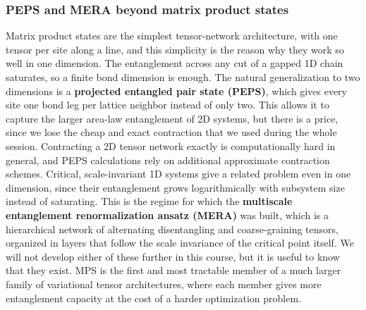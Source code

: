 \documentclass[lecture_notes.tex]{subfiles}
\begin{document}
\subsubsection{PEPS and MERA beyond matrix product states}
Matrix product states are the simplest tensor-network architecture, with one tensor per site along
a line, and this simplicity is the reason why they work so well in one dimension. The entanglement
across any cut of a gapped 1D chain saturates, so a finite bond dimension is enough. The natural
generalization to two dimensions is a \textbf{projected entangled pair state (PEPS)}, which gives
every site one bond leg per lattice neighbor instead of only two. This allows it to capture the
larger area-law entanglement of 2D systems, but there is a price, since we lose the cheap and exact
contraction that we used during the whole session. Contracting a 2D tensor network exactly is
computationally hard in general, and PEPS calculations rely on additional approximate contraction
schemes. Critical, scale-invariant 1D systems give a related problem even in one dimension, since
their entanglement grows logarithmically with subsystem size instead of saturating. This is the
regime for which the \textbf{multiscale entanglement renormalization ansatz (MERA)} was built,
which is a hierarchical network of alternating disentangling and coarse-graining tensors, organized
in layers that follow the scale invariance of the critical point itself. We will not develop either
of these further in this course, but it is useful to know that they exist. MPS is the first and
most tractable member of a much larger family of variational tensor architectures, where each
member gives more entanglement capacity at the cost of a harder optimization problem.
\end{document}
